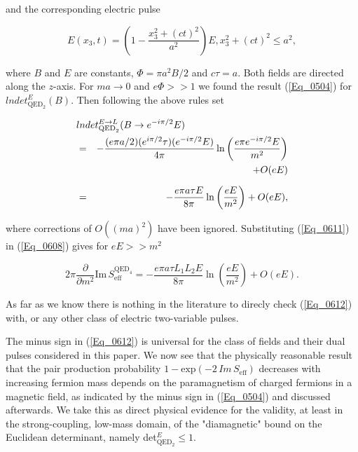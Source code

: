 \documentclass[a4paper,twocolumn,showpacs,preprintnumbers,amsmath,amssymb]{revtex4}
\newcommand{\pdo}[1]{\ensuremath{\frac{\partial }
        {\partial #1 }}}
\begin{document}
\noindent
and the corresponding electric pulse

\begin{equation}
\label{Eq_0610}
E(x_3, t) = \left( 1 - \frac{x^2_3 + (ct)^2}{a^2} \right) E,
  x^2_3 + (ct)^2 \le a^2,
\end{equation}

\noindent
where $B$ and $E$ are constants, $\Phi = \pi a^2 B/2$ and
$c \tau = a$. Both fields are directed along the $z$-axis. For
$ma \to 0$ and $e \Phi >> 1$ we found the result (\ref{Eq_0504}) for
$lndet^E_{\text{QED}_2}(B)$. Then following the above rules set

\begin{eqnarray}
\nonumber
\lefteqn{lndet^{E\to L}_{\text{QED}_2} (B \to e^{-i\pi/2} E)}\\
\nonumber
  &=& -\frac{(e\pi a/2)(e^{i\pi/2}\tau)(e^{-i\pi/2}E)}{4\pi}
      \ln \left(\frac{e\pi e^{-i\pi/2}E}{m^2}\right)\\
\nonumber
  & & \hspace{10mm} + O(eE)\\[2mm]
\label{Eq_0611}
  &=& -\frac{e\pi a \tau E}{8\pi} \ln\left(\frac{eE}{m^2}\right)
      + O(eE),
\end{eqnarray}

\noindent
where corrections of $O((ma)^2)$ have been ignored. Substituting
(\ref{Eq_0611}) in (\ref{Eq_0608}) gives for $eE >> m^2$

\begin{widetext}
\begin{equation}
\label{Eq_0612}
2\pi \pdo{m^2} \text{Im} \, S^{\text{QED}_4}_{\text{eff}}
  = -\frac{e\pi a \tau L_1 L_2 E}{8\pi} \ln\left(\frac{eE}{m^2}\right)
    + O(eE).
\end{equation}
\end{widetext}

\noindent
As far as we know there is nothing in the literature to direcly check
(\ref{Eq_0612}) with, or any other class of electric two-variable
pulses.

The minus sign in (\ref{Eq_0612}) is universal for the class of fields
and their dual pulses considered in this paper. We now see that the
physically reasonable result that the pair production probability
$1 - \text{exp}(-2 \, Im \, S_{\text{eff}})$ decreases with increasing
fermion mass depends on the paramagnetism of charged fermions in a
magnetic field, as indicated by the minus sign in (\ref{Eq_0504}) and
discussed afterwards. We take this as direct physical evidence for the
validity, at least in the strong-coupling, low-mass domain, of the
"diamagnetic" bound on the Euclidean determinant, namely
det$^E_{\text{QED}_2} \le 1$.
\end{document}
